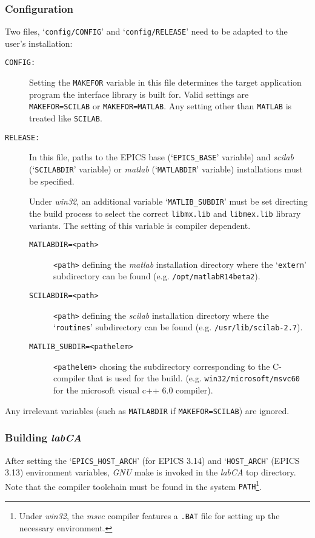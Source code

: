 \documentclass{article}
\newcommand{\sca}{\ita{labCA}}
\newcommand{\scilab}{\ita{scilab}}
\newcommand{\matlab}{\ita{matlab}}
\newcommand{\windoze}{\ita{win32}}
\newcommand{\com}[1]{{\tt #1}}
\newcommand{\ita}[1]{\emph{#1}}
\begin{document}
\subsubsection{Configuration}
Two files, `\com{config/CONFIG}' and `\com{config/RELEASE}' need to
be adapted to the user's installation:
\begin{description}
\item[\tt CONFIG:] Setting the \com{MAKEFOR} variable in this file
determines the target application program the interface library is
built for. Valid settings are \com{MAKEFOR=SCILAB} or \com{MAKEFOR=MATLAB}.
Any setting other than \com{MATLAB} is treated like \com{SCILAB}.
%
%
\item[\tt RELEASE:] In this file, paths to the EPICS base (`\com{EPICS\_BASE}'
variable) and \scilab{} (`\com{SCILABDIR}' variable) or \matlab{} (`\com{MATLABDIR}'
variable) installations must be specified.

Under \windoze{}, an additional variable
`\com{MATLIB\_SUBDIR}' must be set directing the build process to select the correct
\com{libmx.lib} and \com{libmex.lib} library variants. The setting of this variable
is compiler dependent.
\begin{description}
\item[\tt MATLABDIR=<path>] \com{<path>} defining the \matlab{} installation
directory where the `\com{extern}' subdirectory can be found (e.g.
\com{/opt/matlabR14beta2}).
\item[\tt SCILABDIR=<path>] \com{<path>} defining the \scilab{} installation
directory where the `\com{routines}' subdirectory can be found (e.g.
\com{/usr/lib/scilab-2.7}).
\item[\tt MATLIB\_SUBDIR=<pathelem>] \com{<pathelem>} chosing the subdirectory
corresponding to the C-compiler that is used for the build. (e.g. 
\com{win32/microsoft/msvc60} for the microsoft visual c++ 6.0 compiler).
\end{description}
\end{description}
Any irrelevant variables (such as \com{MATLABDIR} if \com{MAKEFOR=SCILAB})
are ignored.

\subsubsection{Building \sca}
After setting the
`\com{EPICS\_HOST\_ARCH}' (for EPICS 3.14) and `\com{HOST\_ARCH}' (EPICS 3.13)
environment variables, \ita{GNU} make is invoked in the \sca{} top 
directory. Note that the compiler toolchain must be found in the system
\com{PATH}\footnote{
Under \windoze, the \ita{msvc} compiler features a \com{.BAT} file for
setting up the necessary environment.
}.
\end{document}
